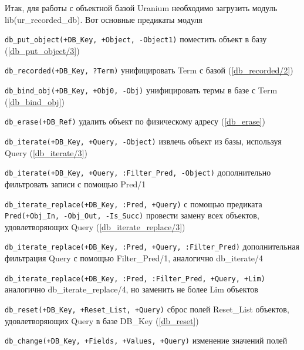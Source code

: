 \documentclass[a4paper]{book}
\def\ur{Uranium}
\begin{document}
Итак, для работы с объектной базой \ur{} необходимо загрузить
модуль lib(ur_recorded_db). Вот основные предикаты модуля

\begin{description}
\item \verb|db_put_object(+DB_Key, +Object, -Object1)| поместить объект в
  базу (\ref{db_put_object/3})
\item \verb|db_recorded(+DB_Key, ?Term)| унифицировать Term с
  базой (\ref{db_recorded/2})
\item \verb|db_bind_obj(+DB_Key, +Obj0, -Obj)| унифицировать
  термы в базе с Term (\ref{db_bind_obj})

\item \verb|db_erase(+DB_Ref)| удалить объект по физическому
  адресу (\ref{db_erase})

\item \verb|db_iterate(+DB_Key, +Query, -Object)| извлечь объект
  из базы, используя Query (\ref{db_iterate/3})
\item \verb|db_iterate(+DB_Key, +Query, :Filter_Pred, -Object)|
  дополнительно фильтровать записи с помощью Pred/1
\item \verb|db_iterate_replace(+DB_Key, :Pred, +Query)| с помощью
  предиката \verb|Pred(+Obj_In, -Obj_Out, -Is_Succ)| провести
  замену всех объектов, удовлетворяющих Query
  (\ref{db_iterate_replace/3})
\item
  \verb|db_iterate_replace(+DB_Key, :Pred, +Query, :Filter_Pred)|
  дополнительная фильтрация Query с помощью Filter_Pred/1,
  аналогично db_iterate/4
\item
  \verb|db_iterate_replace(+DB_Key, :Pred, :Filter_Pred, +Query, +Lim)|
  аналогично db_iterate_replace/4, но заменить не более Lim
  объектов
\item \verb|db_reset(+DB_Key, +Reset_List, +Query)| сброс полей
  Reset_List объектов, удовлетворяющих Query в базе DB_Key (\ref{db_reset})
\item \verb|db_change(+DB_Key, +Fields, +Values, +Query)|
  изменение значений полей 




\end{description}
\end{document}
